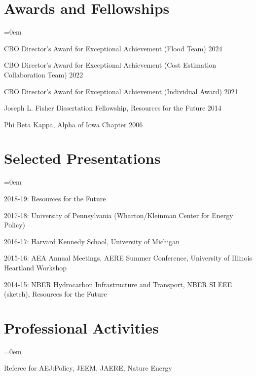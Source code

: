 \documentclass[letterpaper]{article}
\renewenvironment{itemize}{
  \vspace{-0.5em}
  \begin{list}{}{
	\itemsep=0em
    \setlength{\leftmargin}{1.5em}
  }
}{
  \end{list}
}
\begin{document}
\section*{Awards and Fellowships}
\begin{itemize}
\item CBO Director's Award for Exceptional Achievement (Flood Team) \hfill 2024
\item CBO Director's Award for Exceptional Achievement (Cost Estimation Collaboration Team) \hfill 2022
\item CBO Director's Award for Exceptional Achievement (Individual Award) \hfill 2021
\item Joseph L. Fisher Dissertation Fellowship, Resources for the Future	\hfill 2014
\item Phi Beta Kappa, Alpha of Iowa Chapter	\hfill 2006
\end{itemize}

\section*{Selected Presentations}
\begin{itemize}
	\item 2018-19: Resources for the Future
	\item 2017-18: University of Pennsylvania (Wharton/Kleinman Center for Energy Policy)
	\item 2016-17: Harvard Kennedy School, University of Michigan
	\item 2015-16: AEA Annual Meetings, AERE Summer Conference, University of Illinois Heartland Workshop
	\item 2014-15: NBER Hydrocarbon Infrastructure and Transport, NBER SI EEE (sketch), Resources for the Future
\end{itemize}

\section*{Professional Activities}
\begin{itemize}
\item Referee for AEJ:Policy, JEEM, JAERE, Nature Energy
\end{itemize}
\end{document}
